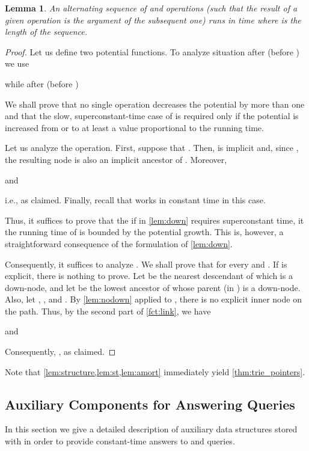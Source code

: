 \documentclass[a4paper]{article}
\newtheorem{lemma}[theorem]{Lemma}
\theoremstyle{remark}
\begin{document}
\begin{lemma}\label{lem:amort}
An alternating sequence of  and  operations (such that the result of a given operation
is the argument of the subsequent one) runs in  time where  is the length of the sequence.
\end{lemma}
\begin{proof}
Let us define two potential functions.
To analyze situation after  (before ) we use
 
 while after  (before )
 

We shall prove that no single operation decreases the potential by more than one
and that the slow, superconstant-time case of  is required only if the potential is
increased from  or  to at least a value proportional to the running time.

Let us analyze the  operation. First, suppose that .
Then,  is implicit and, since ,
the resulting node  is also an implicit ancestor of .
Moreover,

and

i.e.,  as claimed.
Finally, recall that  works in constant time in this case.

Thus, it suffices to prove that the if  in \cref{lem:down} requires superconstant time,
it the running time of  is bounded by the potential growth.
 This is, however, a straightforward consequence of the formulation of \cref{lem:down}.

 Consequently, it suffices to analyze . We shall prove that  for every  and .
 If  is explicit, there is nothing to prove.
 Let  be the nearest descendant of  which is a down-node, and let  be the lowest ancestor of 
 whose parent (in ) is a down-node. Also, let , , and .
 By \cref{lem:nodown} applied to , there is no explicit inner node on the  path.
 Thus, by the second part of \cref{fct:link}, we have
 
 and
 
 Consequently, , as claimed.
\end{proof}

Note that \cref{lem:structure,lem:st,lem:amort} immediately yield \cref{thm:trie_pointers}.

\subsection{Auxiliary Components for Answering Queries}\label{sec:trie_extra}
In this section we give a detailed description of auxiliary data structures stored with 
in order to provide constant-time answers to  and  queries.
\end{document}
